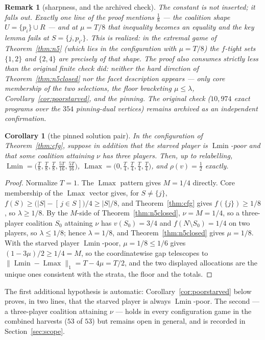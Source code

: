 \documentclass[11pt]{article}
\newtheorem{corollary}[theorem]{Corollary}
\newtheorem{remark}[theorem]{Remark}
\newcommand{\Lmin}{\operatorname{Lmin}}
\newcommand{\Lmax}{\operatorname{Lmax}}
\begin{document}
\begin{remark}[sharpness, and the archived check]\label{rem:cfghand}
The constant is not inserted; it falls out.  Exactly one line of the proof
mentions $\tfrac18$ --- the coalition shape $U=\{p_i\}\cup R$ --- and at
$\mu=T/8$ that inequality becomes an equality and the key lemma fails at
$S=\{j,p_{i'}\}$.  This is realized: in the extremal game of
Theorem~\ref{thm:n5} (which lies in the configuration with $\mu=T/8$) the
$f$-tight sets $\{1,2\}$ and $\{2,4\}$ are precisely of that shape.  The
proof also consumes strictly less than the original finite check did:
neither the hard direction of Theorem~\ref{thm:n5closed} nor the facet
description appears --- only core membership of the two selections, the
floor bracketing $\mu\le\lambda$, Corollary~\ref{cor:poorstarved}, and the
pinning.  The original check ($10{,}974$ exact programs over the $354$
pinning-dual vertices) remains archived as an independent confirmation.
\end{remark}

\begin{corollary}[the pinned solution pair]\label{cor:cfg}
In the configuration of Theorem~\ref{thm:cfg}, suppose in addition that the
starved player is $\Lmin$-poor and that some coalition attaining $\nu$ has
three players.  Then, up to relabelling,
$\Lmin=\bigl(\tfrac T8,\tfrac T8,\tfrac T8,\tfrac{5T}{16},
\tfrac{5T}{16}\bigr)$,
$\Lmax=\bigl(0,\tfrac T4,\tfrac T4,\tfrac T4,\tfrac T4\bigr)$, and
$\rho(v)=\tfrac12$ exactly.
\end{corollary}

\begin{proof}
Normalize $T=1$.  The $\Lmax$ pattern gives $M=1/4$ directly.  Core
membership of the $\Lmax$ vector gives, for $S\ne\{j\}$,
$f(S)\ge\bigl(|S|-[\,j\in S\,]\bigr)/4\ge|S|/8$, and
Theorem~\ref{thm:cfg} gives $f(\{j\})\ge1/8$, so $\lambda\ge1/8$.  By
the $M$-side of Theorem~\ref{thm:n5closed}, $\nu=M=1/4$, so a
three-player coalition $S_0$ attaining $\nu$ has $v(S_0)=3/4$ and
$f(N\setminus S_0)=1/4$ on two players, so $\lambda\le1/8$; hence
$\lambda=1/8$, and Theorem~\ref{thm:n5closed} gives $\mu=1/8$.  With the
starved player $\Lmin$-poor, $\mu=1/8\le1/6$ gives
$(1-3\mu)/2\ge1/4=M$, so the coordinatewise gap telescopes to
$\|\Lmin-\Lmax\|_1=T-4\mu=T/2$, and the two displayed allocations are
the unique ones consistent with the strata, the floor and the totals.
\end{proof}

The first additional hypothesis is automatic:
Corollary~\ref{cor:poorstarved} below proves, in two lines, that the
starved player is always $\Lmin$-poor.  The second --- a three-player
coalition attaining $\nu$ --- holds in every configuration game in the
combined harvests ($53$ of $53$) but remains open in general, and is
recorded in Section~\ref{sec:scope}.
\end{document}
